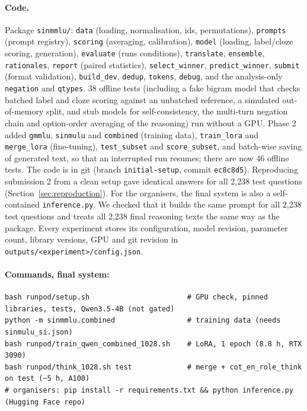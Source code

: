 \documentclass[10pt,a4paper]{article}
\begin{document}
\paragraph{Code.} Package \texttt{sinmmlu/}: \texttt{data} (loading, normalisation, ids, permutations), \texttt{prompts}
(prompt registry), \texttt{scoring} (averaging, calibration), \texttt{model} (loading, label/cloze scoring, generation),
\texttt{evaluate} (runs conditions), \texttt{translate}, \texttt{ensemble}, \texttt{rationales}, \texttt{report}
(paired statistics), \texttt{select\_winner}, \texttt{predict\_winner}, \texttt{submit} (format validation),
\texttt{build\_dev}, \texttt{dedup}, \texttt{tokens}, \texttt{debug}, and the analysis-only \texttt{negation} and
\texttt{qtypes}. 38 offline tests (including a fake bigram model that checks batched label and cloze scoring against
an unbatched reference, a simulated out-of-memory split, and stub models for self-consistency, the multi-turn
negation chain and option-order averaging of the reasoning) run without a GPU.
Phase 2 added \texttt{gmmlu}, \texttt{sinmulu} and \texttt{combined} (training data), \texttt{train\_lora} and
\texttt{merge\_lora} (fine-tuning), \texttt{test\_subset} and \texttt{score\_subset}, and batch-wise saving of generated
text, so that an interrupted run resumes; there are now 46 offline tests. The code is in git (branch
\texttt{initial-setup}, commit \texttt{ec8c8d5}). Reproducing submission 2 from a clean setup gave identical answers for
all 2,238 test questions (Section~\ref{sec:reproduction}). For the organisers, the final system is also a
self-contained \texttt{inference.py}. We checked that it builds the same prompt for all 2,238 test questions and
treats all 2,238 final reasoning texts the same way as the package. Every experiment stores its configuration, model revision, parameter count, library versions, GPU and
git revision in \texttt{outputs/<experiment>/config.json}.

\paragraph{Commands, final system:}
\begin{Verbatim}[fontsize=\small,frame=single]
bash runpod/setup.sh                       # GPU check, pinned libraries, tests, Qwen3.5-4B (not gated)
python -m sinmmlu.combined                 # training data (needs sinmulu_si.json)
bash runpod/train_qwen_combined_1028.sh    # LoRA, 1 epoch (8.8 h, RTX 3090)
bash runpod/think_1028.sh test             # merge + cot_en_role_think on test (~5 h, A100)
# organisers: pip install -r requirements.txt && python inference.py   (Hugging Face repo)
\end{Verbatim}
\end{document}
